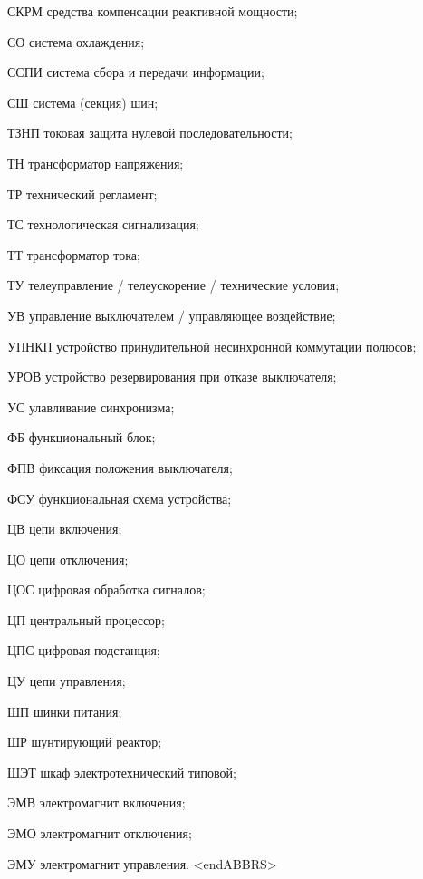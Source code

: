 \begin{list}{}
\item[СКРМ] средства компенсации реактивной мощности;
\item[СО] система охлаждения;
\item[ССПИ] система сбора и передачи информации;
\item[СШ] система (секция) шин;
\item[ТЗНП] токовая защита нулевой последовательности;
\item[ТН] трансформатор напряжения;
\item[ТР] технический регламент;
\item[ТС] технологическая сигнализация;
\item[ТТ] трансформатор тока;
\item[ТУ] телеуправление / телеускорение / технические условия;
\item[УВ] управление выключателем / управляющее воздействие;
\item[УПНКП] устройство принудительной несинхронной коммутации полюсов;
\item[УРОВ] устройство резервирования при отказе выключателя;
\item[УС] улавливание синхронизма;
\item[ФБ] функциональный блок;
\item[ФПВ] фиксация положения выключателя;
\item[ФСУ] функциональная схема устройства;
\item[ЦВ] цепи включения;
\item[ЦО] цепи отключения;
\item[ЦОС] цифровая обработка сигналов;
\item[ЦП] центральный процессор;
\item[ЦПС] цифровая подстанция;
\item[ЦУ] цепи управления;
\item[ШП] шинки питания;
\item[ШР] шунтирующий реактор;
\item[ШЭТ] шкаф электротехнический типовой;
\item[ЭМВ] электромагнит включения;
\item[ЭМО] электромагнит отключения;
\item[ЭМУ] электромагнит управления.
{\color{white}\fontsize{0.1pt}{0.1pt}\selectfont<endABBRS>}
\end{list}
